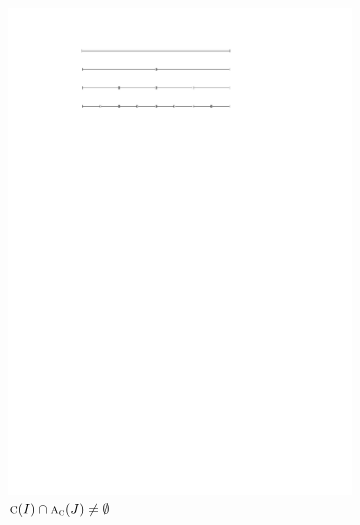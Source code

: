 \documentclass[english,gradu]{tktltiki2018}
\begin{document}
\begin{figure}
	\hfil
	\begin{subfigure}[t]{0.32\textwidth}\centering
		\includegraphics[width=\textwidth,page=4]{fig/iproof}
		\caption{$\textsc{c}(I)\cap\textsc{a}_{\textsc{c}}(J)\neq\emptyset$}\label{fig:iproof:anc}
	\end{subfigure}
	\hfil
	\begin{subfigure}[t]{0.32\textwidth}\centering

\end{subfigure}
\end{figure}
\end{document}
